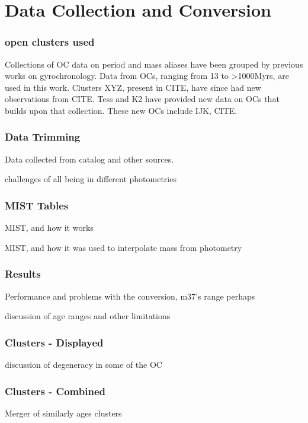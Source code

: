 \documentclass[fleqn,usenatbib]{mnras}
\begin{document}
\section{Data Collection and Conversion}
\subsubsection{open clusters used}
Collections of OC data on period and mass aliases have been grouped by previous works on gyrochronology.
Data from OCs, ranging from 13 to >1000Myrs, are used in this work.
Clusters XYZ, present in CITE, have since had new observations from CITE.
Tess and K2 have provided new data on OCs that builds upon that collection.
These new OCs include IJK, CITE. 

\subsubsection{Data Trimming}
Data collected from catalog and other sources.

challenges of all being in different photometries

\subsubsection{MIST Tables}
MIST, and how it works

MIST, and how it was used to interpolate mass from photometry

\subsubsection{Results}
Performance and problems with the conversion, m37's range perhaps

discussion of age ranges and other limitations

\subsubsection{Clusters - Displayed}
discussion of degeneracy in some of the OC

\subsubsection{Clusters - Combined}
Merger of similarly ages clusters
\end{document}
